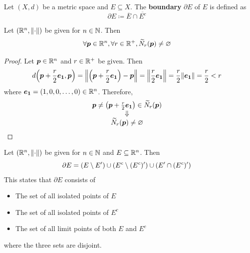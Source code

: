 \bigskip

\begin{definition} \label{an:def:boundary}
    Let $(X, d)$ be a metric space and $E \subseteq X$. The \textbf{boundary} $\partial E$ of $E$ is defined as
    \[
    \partial E \coloneqq \overline{E} \cap \overline{E^{c}}
    \]
\end{definition}

\bigskip

\begin{lemma} \label{an:lem:deleted-neighborhood-in-rn-is-non-empty}
    Let $(\R^{n}, \norm*{\cdot})$ be given for $n \in \N$. Then
    \[
    \forall \bm{p} \in \R^{n}, \forall r \in \R^{+}, \widetilde{N}_r(\bm{p}) \neq \vnot
    \]
\end{lemma}

\begin{proof}
    Let $\bm{p} \in \R^{n}$ and $r \in \R^{+}$ be given. Then
    \[
    d\paren*{\bm{p} + \frac{r}{2} \bm{e_{1}}, \bm{p}} = \norm*{\paren*{\bm{p} + \frac{r}{2} \bm{e_{1}}}
    - \bm{p}} = \norm*{\frac{r}{2} \bm{e_{1}}} = \frac{r}{2} \norm*{\bm{e_{1}}} = \frac{r}{2} < r
    \]
    where $\bm{e_{1}} = (1, 0, 0, \dots, 0) \in \R^{n}$. Therefore,
    \[
    \begin{array}{c}
        \bm{p} \neq \paren*{\bm{p} + \frac{r}{2} \bm{e_{1}}} \in \widetilde{N}_r(\bm{p}) \\
        \Downarrow \\
        \widetilde{N}_r(\bm{p}) \neq \vnot
    \end{array}
    \]
\end{proof}

\bigskip

\begin{theorem} \label{an:thm:properties-of-boundary-in-rn}
    Let $(\R^{n}, \norm*{\cdot})$ be given for $n \in \N$ and $E \subseteq \R^{n}$. Then
    \[
    \partial E = \paren*{E \setminus E'} \cup \paren*{E^{c} \setminus (E^{c})'} \cup \paren*{E' \cap (E^{c})'}
    \]
    This states that $\partial E$ consists of
    \begin{itemize}
        \item The set of all isolated points of $E$
        \item The set of all isolated points of $E^{c}$
        \item The set of all limit points of both $E$ and $E^{c}$
    \end{itemize}
    where the three sets are disjoint.
\end{theorem}

